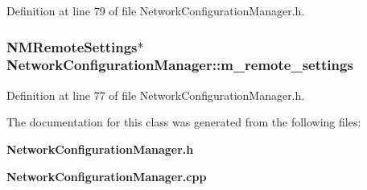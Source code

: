 \-Definition at line 79 of file \-Network\-Configuration\-Manager.\-h.

\subsubsection[{m\-\_\-remote\-\_\-settings}]{\setlength{\rightskip}{0pt plus 5cm}\-N\-M\-Remote\-Settings$\ast$ {\bf \-Network\-Configuration\-Manager\-::m\-\_\-remote\-\_\-settings}\hspace{0.3cm}{\ttfamily  [private]}}\label{classNetworkConfigurationManager_a4e74292e88e07caebee36c7a6fba78f9}


\-Definition at line 77 of file \-Network\-Configuration\-Manager.\-h.



\-The documentation for this class was generated from the following files\-:\begin{DoxyCompactItemize}
\item 
{\bf \-Network\-Configuration\-Manager.\-h}\item 
{\bf \-Network\-Configuration\-Manager.\-cpp}\end{DoxyCompactItemize}

